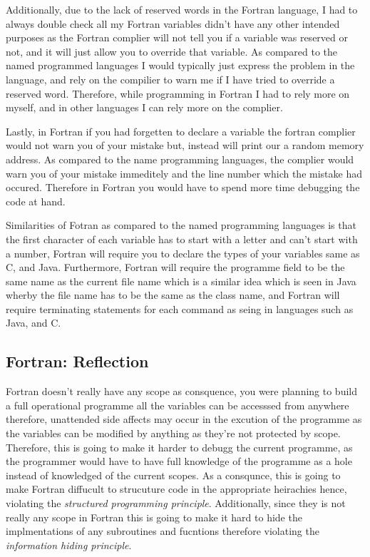 \documentclass[
	12pt, %
]{fphw}
\begin{document}
Additionally, due to the lack of reserved words in the Fortran language, I had  to
always double check all my Fortran variables didn't have any other intended
purposes as the Fortran complier will not tell you if a variable was reserved or
not, and it will just allow you to override that variable. As compared to the named
programmed languages I would typically just express the problem in the language,
and rely on the compilier to warn me if I have tried to override a reserved word.
Therefore, while programming in Fortran I had to rely more on myself, and in other
languages I can rely more on the complier.\par

Lastly, in Fortran if you had forgetten to declare a variable the fortran
complier would not warn you of your mistake but, instead will print our a random
memory address. As compared to the name programming languages, the complier
would warn you of your mistake immeditely and the line number which the mistake
had occured. Therefore in Fortran you would have to spend more time debugging
the code at hand.\par

Similarities of Fotran as compared to the named programming languages is that
the first character of each variable has to start with a letter and can't start
with a number, Fortran will require you to declare the types of your variables
same as C, and Java. Furthermore, Fortran will require the programme field to be
the same name as the current file name which is a similar idea which is seen in
Java wherby the file name has to be the same as the class name, and Fortran will
require terminating statements for each command as seing in languages such as
Java, and C.

\subsection{Fortran: Reflection}

Fortran doesn't really have any scope as consquence, you were planning to build
a full operational programme all the variables can be accesssed from anywhere
therefore, unattended side affects may occur in the excution of the programme as
the variables can be modified by anything as they're not protected by scope.
Therefore, this is going to make it harder to debugg the current programme, as the
programmer would have to have full knowledge of the programme as a hole instead
of knowledged of the current scopes. As a consqunce, this is going to make Fortran
diffucult to strucuture code in the appropriate heirachies hence, violating the
\emph{structured programming principle}. Additionally, since they is not really
any scope in Fortran this is going to make it hard to hide the implmentations of
any subroutines and fucntions therefore violating the \emph{information hiding
principle}.\par
\end{document}
